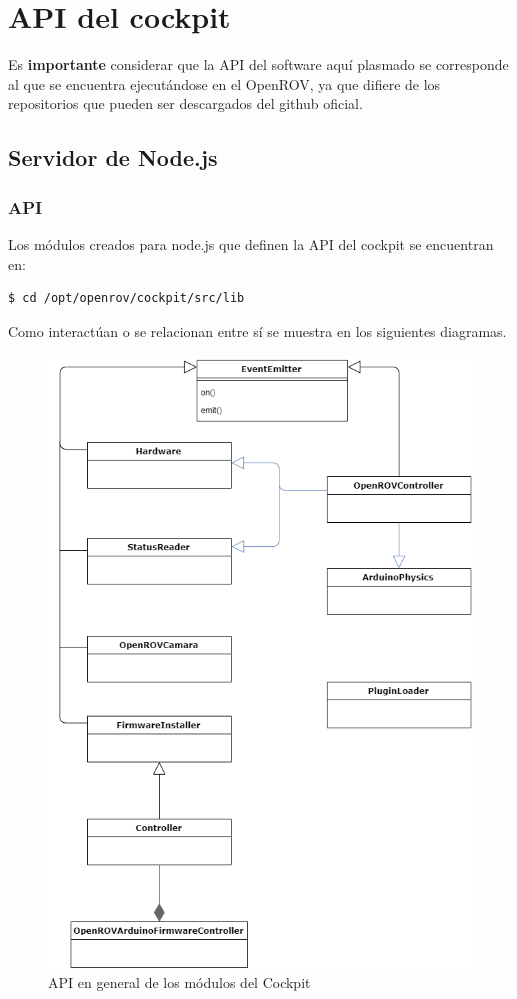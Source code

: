 \chapter{API del cockpit}
\label{apendiceC}

Es \textbf{importante} considerar que la API del software aquí plasmado se corresponde al que se encuentra ejecutándose en el OpenROV, ya que difiere de los repositorios que pueden ser descargados del github oficial.

\section{Servidor de Node.js}

\subsection{API}
Los módulos creados para node.js que definen la API del cockpit se encuentran en:

\begin{verbatim}
$ cd /opt/openrov/cockpit/src/lib    
\end{verbatim} 
Como interactúan o se relacionan entre sí se muestra en los siguientes diagramas. 

\begin{figure}[H]
    \centering
    \includegraphics[scale=0.65]{partes/ImgSophia/ApendiceC/ApiCockpit1.png}
    \caption{API en general de los módulos del Cockpit}
    \label{fig:APICockpit1}
\end{figure}

